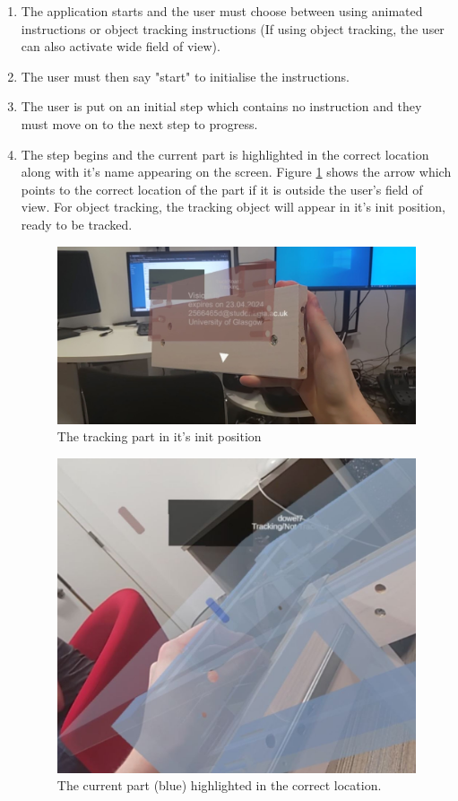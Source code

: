 \documentclass{l4proj}
\begin{document}
\begin{enumerate}
    \item The application starts and the user must choose between using animated instructions or object tracking instructions (If using object tracking, the user can also activate wide field of view).
    \item The user must then say "start" to initialise the instructions.
    \item The user is put on an initial step which contains no instruction and they must move on to the next step to progress.
    \item The step begins and the current part is highlighted in the correct location along with it's name appearing on the screen. Figure \ref{fig:initpos} shows the arrow which points to the correct location of the part if it is outside the user's field of view. For object tracking, the tracking object will appear in it's init position, ready to be tracked.

    \begin{figure}[hbt!]
        \centering
        \includegraphics[width=0.7\linewidth]{dissertation//images/initPose.JPG}
        \caption{The tracking part in it's init position}
        \label{fig:initpos}
    \end{figure}

    \begin{figure}[hbt!]
        \centering
        \includegraphics[width=0.5\linewidth]{dissertation//images/partWaiting.JPG}
        \caption{The current part (blue) highlighted in the correct location.}
        \label{fig:partWaiting}
    \end{figure}


\end{enumerate}
\end{document}
